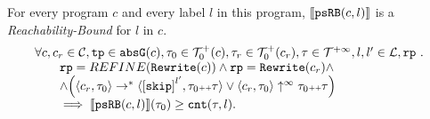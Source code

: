 \begin{theorem}
For every program ${c}$ and every label $l$ in this program,
$\llbracket \mathtt{psRB}(c, l) \rrbracket$ is a \emph{Reachability-Bound} for $l$ in $c$.
%
\[
    \begin{array}{l}
      \forall c, c_r \in \cdom, \tpath \in \absG(c), \trace_0 \in \ftdom_0(c),  \trace_r \in \ftdom_0(c_r), \trace \in \tdom, l, l' \in \ldom, \rprog \sthat 
      \\ \qquad
      \rprog = REFINE(\algrewrite(c))
      \land 
      \rprog = \algrewrite(c_r)
      \land
      \\ \qquad
      \land
      \Big(
      \config{c_r, \trace_0} \rightarrow^* \config{\clabel{\eskip}^{l'}, \trace_0 \tracecat \trace}
      \lor \config{c_r, \trace_0} \uparrow^{\infty} \trace_0 \tracecat \trace 
      \Big)
      \\ \qquad
      \implies \econfig{\psRB(c, l)}(\trace_0) \geq \counter(\trace, l).
    \end{array}
  \]
\end{theorem}
%
